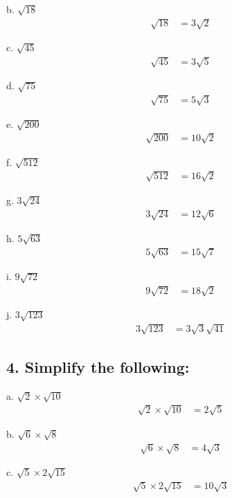 \documentclass{article}
\begin{document}
b. $\sqrt{18}$
\begin{align*}
    \sqrt{18} &= 3\sqrt{2}
\end{align*}

c. $\sqrt{45}$
\begin{align*}
    \sqrt{45} &= 3\sqrt{5}
\end{align*}

d. $\sqrt{75}$
\begin{align*}
    \sqrt{75} &= 5\sqrt{3}
\end{align*}

e. $\sqrt{200}$
\begin{align*}
    \sqrt{200} &= 10\sqrt{2}
\end{align*}

f. $\sqrt{512}$
\begin{align*}
    \sqrt{512} &= 16\sqrt{2}
\end{align*}

g. $3 \sqrt{24}$
\begin{align*}
    3 \sqrt{24} &= 12\sqrt{6}
\end{align*}

h. $5 \sqrt{63}$
\begin{align*}
    5 \sqrt{63} &= 15\sqrt{7}
\end{align*}

i. $9 \sqrt{72}$
\begin{align*}
    9 \sqrt{72} &= 18\sqrt{2}
\end{align*}

j. $3 \sqrt{123}$
\begin{align*}
    3 \sqrt{123} &= 3\sqrt{3}\sqrt{41}
\end{align*}

\subsection*{4. Simplify the following:}

a. $\sqrt{2} \times \sqrt{10}$
\begin{align*}
    \sqrt{2} \times \sqrt{10} &= 2\sqrt{5}
\end{align*}

b. $\sqrt{6} \times \sqrt{8}$
\begin{align*}
    \sqrt{6} \times \sqrt{8} &= 4\sqrt{3}
\end{align*}

c. $\sqrt{5} \times 2 \sqrt{15}$
\begin{align*}
    \sqrt{5} \times 2 \sqrt{15} &= 10\sqrt{3}
\end{align*}
\end{document}
